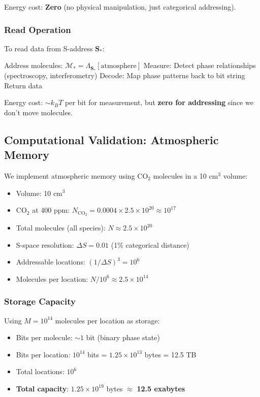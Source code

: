 Energy cost: \textbf{Zero} (no physical manipulation, just categorical addressing).

\subsubsection{Read Operation}

To read data from S-address $\mathbf{S}_*$:
\begin{algorithmic}[1]
\State Address molecules: $\mathcal{M}_* = \Lambda_{\mathbf{S}_*}[\text{atmosphere}]$
\State Measure: Detect phase relationships (spectroscopy, interferometry)
\State Decode: Map phase patterns back to bit string
\State Return data
\end{algorithmic}

Energy cost: $\sim k_B T$ per bit for measurement, but \textbf{zero for addressing} since we don't move molecules.

\subsection{Computational Validation: Atmospheric Memory}

We implement atmospheric memory using CO$_2$ molecules in a 10 cm$^3$ volume:

\begin{itemize}
\item Volume: 10 cm$^3$
\item CO$_2$ at 400 ppm: $N_{\text{CO}_2} = 0.0004 \times 2.5 \times 10^{20} \approx 10^{17}$
\item Total molecules (all species): $N \approx 2.5 \times 10^{20}$
\item S-space resolution: $\Delta S = 0.01$ (1\% categorical distance)
\item Addressable locations: $(1/\Delta S)^3 = 10^6$
\item Molecules per location: $N/10^6 \approx 2.5 \times 10^{14}$
\end{itemize}

\subsubsection{Storage Capacity}

Using $M = 10^{14}$ molecules per location as storage:
\begin{itemize}
\item Bits per molecule: $\sim 1$ bit (binary phase state)
\item Bits per location: $10^{14}$ bits = $1.25 \times 10^{13}$ bytes = 12.5 TB
\item Total locations: $10^6$
\item \textbf{Total capacity}: $1.25 \times 10^{19}$ bytes $\approx$ \textbf{12.5 exabytes}
\end{itemize}

